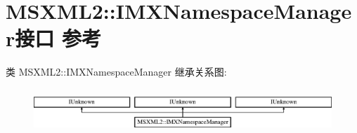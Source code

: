 \hypertarget{interface_m_s_x_m_l2_1_1_i_m_x_namespace_manager}{}\section{M\+S\+X\+M\+L2\+:\+:I\+M\+X\+Namespace\+Manager接口 参考}
\label{interface_m_s_x_m_l2_1_1_i_m_x_namespace_manager}
类 M\+S\+X\+M\+L2\+:\+:I\+M\+X\+Namespace\+Manager 继承关系图\+:\begin{figure}[H]
\begin{center}
\leavevmode
\includegraphics[height=1.704718cm]{interface_m_s_x_m_l2_1_1_i_m_x_namespace_manager}
\end{center}
\end{figure}
